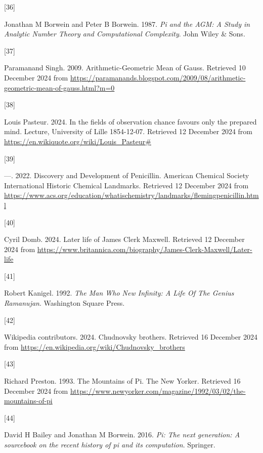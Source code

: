 \documentclass[
  a4paper,
]{article}
\newlength{\cslhangindent}
\newlength{\csllabelwidth}
\newenvironment{CSLReferences}[2] %
 {\begin{list}{}{%
  \setlength{\itemindent}{0pt}
  \setlength{\leftmargin}{0pt}
  \setlength{\parsep}{0pt}
  \ifodd #1
   \setlength{\leftmargin}{\cslhangindent}
   \setlength{\itemindent}{-1\cslhangindent}
  \fi
  \setlength{\itemsep}{#2\baselineskip}}}
 {\end{list}}
\newcommand{\CSLLeftMargin}[1]{\parbox[t]{\csllabelwidth}{\strut#1\strut}}
\newcommand{\CSLRightInline}[1]{\parbox[t]{\linewidth - \csllabelwidth}{\strut#1\strut}}
\begin{document}
\begin{CSLReferences}{0}{0}
\CSLLeftMargin{{[}36{]} }%
\CSLRightInline{Jonathan M Borwein and Peter B Borwein. 1987. \emph{{Pi
and the AGM}: {A Study in Analytic Number Theory and Computational
Complexity}}. John Wiley \& Sons.}

\CSLLeftMargin{{[}37{]} }%
\CSLRightInline{Paramanand Singh. 2009. {Arithmetic-Geometric Mean of
Gauss}. Retrieved 10 December 2024 from
\url{https://paramanands.blogspot.com/2009/08/arithmetic-geometric-mean-of-gauss.html?m=0}}

\CSLLeftMargin{{[}38{]} }%
\CSLRightInline{Louis Pasteur. 2024. {In the fields of observation
chance favours only the prepared mind}. {Lecture, University of Lille
1854-12-07}. Retrieved 12 December 2024 from
\url{https://en.wikiquote.org/wiki/Louis_Pasteur\#}}

\CSLLeftMargin{{[}39{]} }%
\CSLRightInline{---. 2022. {Discovery and Development of Penicillin}.
{American Chemical Society International Historic Chemical Landmarks}.
Retrieved 12 December 2024 from
\url{https://www.acs.org/education/whatischemistry/landmarks/flemingpenicillin.html}}

\CSLLeftMargin{{[}40{]} }%
\CSLRightInline{Cyril Domb. 2024. {Later life of James Clerk Maxwell}.
Retrieved 12 December 2024 from
\url{https://www.britannica.com/biography/James-Clerk-Maxwell/Later-life}}

\CSLLeftMargin{{[}41{]} }%
\CSLRightInline{Robert Kanigel. 1992. \emph{{The Man Who New Infinity}:
{A Life Of The Genius Ramanujan}}. {Washington Square Press}.}

\CSLLeftMargin{{[}42{]} }%
\CSLRightInline{Wikipedia contributors. 2024. {Chudnovsky brothers}.
Retrieved 16 December 2024 from
\url{https://en.wikipedia.org/wiki/Chudnovsky_brothers}}

\CSLLeftMargin{{[}43{]} }%
\CSLRightInline{Richard Preston. 1993. {The Mountains of Pi}. {The New
Yorker}. Retrieved 16 December 2024 from
\url{https://www.newyorker.com/magazine/1992/03/02/the-mountains-of-pi}}

\CSLLeftMargin{{[}44{]} }%
\CSLRightInline{David H Bailey and Jonathan M Borwein. 2016. \emph{Pi:
The next generation: A sourcebook on the recent history of pi and its
computation}. Springer.}


\end{CSLReferences}
\end{document}
